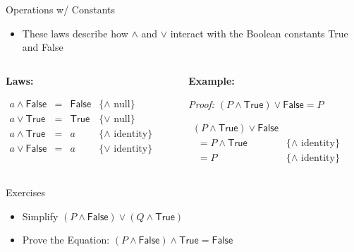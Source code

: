 \documentclass[11pt,t,pdf,xcolor=svgnames,aspectratio=169]{beamer}
\providecommand{\tightlist}{%
  \setlength{\itemsep}{5pt}\setlength{\parskip}{0pt}}
\begin{document}
\begin{frame}{Operations w/ Constants}
\protect\hypertarget{operations-w-constants}{}
\begin{itemize}
\tightlist
\item
  These laws describe how \(\land\) and \(\lor\) interact with the
  Boolean constants True and False
\end{itemize}

\begin{columns}[T]
\begin{column}{0.48\textwidth}
\textbf{Laws:}

\begin{center}
$\begin{array}{rcll}
a \land \textsf{False} & = & \textsf{False} & \{\land\,\, \textrm{null}\} \\
a \lor \textsf{True}   & = & \textsf{True}  & \{\lor\,\, \textrm{null}\} \\
a \land \textsf{True}  & = & a              & \{\land\,\, \textrm{identity}\} \\
a \lor \textsf{False}  & = & a              & \{\lor\,\, \textrm{identity}\}
\end{array}$
\end{center}
\end{column}

\begin{column}{0.48\textwidth}
\textbf{Example:}

\emph{Proof:}
\(\left(P \land \textsf{True}\right) \lor \textsf{False} = P\)

\begin{center}
$\begin{array}{lr}
\left(P \land \textsf{True}\right) \lor \textsf{False} & \\
\,\,\,= P \land \textsf{True}                          & \{\land\,\, \textrm{identity}\} \\
\,\,\,= P                                              & \{\land\,\, \textrm{identity}\}
\end{array}$
\end{center}
\end{column}
\end{columns}
\end{frame}

\begin{frame}{Exercises}
\protect\hypertarget{exercises-1}{}
\begin{itemize}
\item
  Simplify
  \(\left(P \land \textsf{False}\right) \lor (Q \land \textsf{True})\)
\item
  Prove the Equation:
  \(\left(P \land \textsf{False}\right) \land \textsf{True} = \textsf{False}\)
\end{itemize}
\end{frame}
\end{document}
